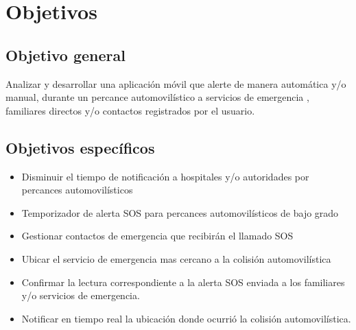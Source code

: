  

\section{Objetivos}
\subsection{Objetivo general}
Analizar y desarrollar una aplicación móvil que alerte de manera automática y/o manual, durante un percance automovilístico a servicios de emergencia , familiares directos y/o contactos registrados por el usuario.
\subsection{Objetivos específicos}
\begin{itemize}
	\item Disminuir el tiempo de notificación a hospitales y/o autoridades por percances automovilísticos
	\item Temporizador de alerta SOS para percances automovilísticos de bajo grado
	\item Gestionar contactos de emergencia que recibirán el llamado SOS
	\item Ubicar el servicio de emergencia mas cercano a la colisión automovilística
	\item Confirmar la lectura correspondiente a la alerta SOS enviada a los familiares y/o servicios de emergencia.
	\item Notificar en tiempo real la ubicación donde ocurrió la colisión automovilística.
\end{itemize}

